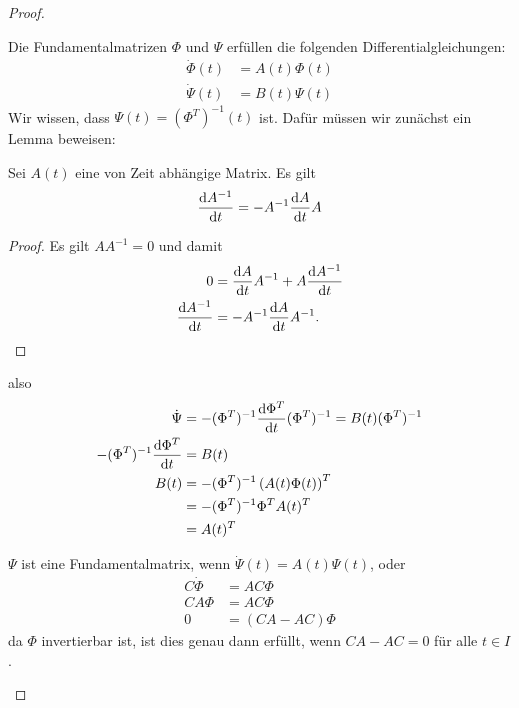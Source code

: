 \begin{proof}
	\begin{parts}
		\item Die Fundamentalmatrizen $\Phi$ und $\Psi$ erf\"{u}llen die folgenden Differentialgleichungen:
		\begin{align*}
			\dot{\Phi}(t)&=A(t)\Phi(t)\\
			\dot{\Psi}(t)&=B(t)\Psi(t)
		\end{align*}
	Wir wissen, dass $\Psi(t)= (\Phi^T)^{-1}(t)$ ist. Dafür müssen wir zunächst ein Lemma beweisen:
	\begin{Lemma}
		Sei $A(t)$ eine von Zeit abhängige Matrix. Es gilt
		\[\dv{A^{-1}}{t}=-A^{-1}\dv{A}{t}A\]
	\end{Lemma}
\begin{proof}
	Es gilt $AA^{-1}=0$ und damit
	\begin{align*}
		0&=\dv{A}{t}A^{-1} + A\dv{A^{-1}}{t}\\
		\dv{A^{-1}}{t}&=-A^{-1}\dv{A}{t}A^{-1}.\qedhere
	\end{align*}
\end{proof}
also
\begin{align*}
\dot{\Psi}&= -(\Phi^T)^{-1}{\dv{\Phi^T}{t}}(\Phi^T)^{-1}=B(t)(\Phi^T)^{-1}\\
-(\Phi^T)^{-1}\dv{\Phi^T}{t}&= B(t)\\
B(t)&= -(\Phi^T)^{-1}\left(A(t) \Phi(t)\right)^T\\
&= -(\Phi^T)^{-1} \Phi^T A(t)^T\\
&= A(t)^T
\end{align*}
\item $\Psi$ ist eine Fundamentalmatrix, wenn $\dot{\Psi}(t)=A(t)\Psi(t)$, oder
\begin{align*}
	C\dot{\Phi}&= AC\Phi\\
	CA\Phi&=AC\Phi\\
	0&= (CA-AC)\Phi
\end{align*}
da $\Phi$ invertierbar ist, ist dies genau dann erfüllt, wenn $CA-AC=0$ f\"{u}r alle $t\in I$.\qedhere
	\end{parts}
\end{proof}
